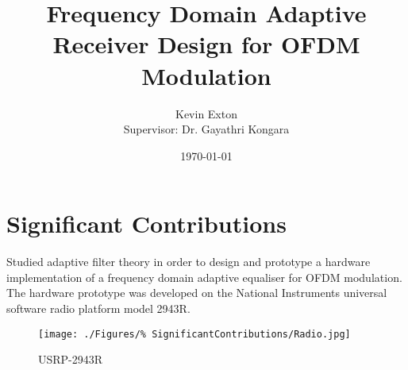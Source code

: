 \documentclass[a4paper]{report}
\title{Frequency Domain Adaptive Receiver Design for OFDM Modulation}
\author{Kevin Exton \\Supervisor: Dr. Gayathri Kongara}
\date{\today}
\begin{document}
\maketitle
\renewcommand{\abstractname}{Executive Summary}
\newpage

\newpage
{}
\section*{Significant Contributions}
Studied adaptive filter theory in order to design and prototype %
a hardware implementation of a frequency domain adaptive equaliser %
for OFDM modulation. The hardware prototype was developed on the %
National Instruments universal software radio platform model 2943R.
\begin{figure*}[ht]
	\centering
	\texttt{[image: ./Figures/\%
	SignificantContributions/Radio.jpg]}
	\caption*{USRP-2943R}
\end{figure*}
\end{document}
